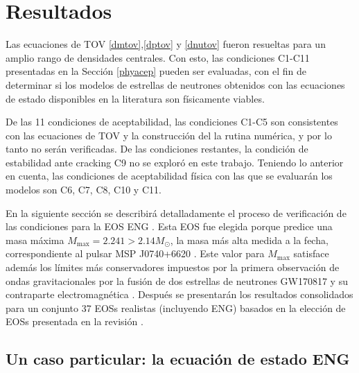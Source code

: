\chapter{Resultados}

\noindent Las ecuaciones de TOV \eqref{dmtov},\eqref{dptov} y \eqref{dnutov} fueron resueltas para un amplio rango de densidades centrales. Con esto, las condiciones C1-C11 presentadas en la Sección \ref{phyacep} pueden ser evaluadas, con el fin de determinar si los modelos de estrellas de neutrones obtenidos con las ecuaciones de estado disponibles en la literatura son físicamente viables.

De las 11 condiciones de aceptabilidad, las condiciones C1-C5 son consistentes con las ecuaciones de TOV y la construcción del la rutina numérica, y por lo tanto no serán verificadas. De las condiciones restantes, la condición de estabilidad ante cracking C9 no se exploró en este trabajo. Teniendo lo anterior en cuenta, las condiciones de aceptabilidad física con las que se evaluarán los modelos son C6, C7, C8, C10 y C11.


En la siguiente sección se describirá detalladamente el proceso de verificación de las condiciones para la EOS ENG \cite{Engvik1994}. Esta EOS fue elegida porque predice una masa máxima $M_{\text{max}}= 2.241 > 2.14M_{\odot}$, la masa más alta medida a la fecha, correspondiente al pulsar MSP J0740+6620 \cite{Cromartie2019}. Este valor para $M_{\text{max}}$ satisface además los límites más conservadores impuestos por la primera observación de ondas gravitacionales por la fusión de dos estrellas de neutrones GW170817 y su contraparte electromagnética \cite{Rezzolla2017,Radice2018,Ruiz2018,Shibata2019}. Después se presentarán los resultados consolidados para un conjunto 37 EOSs realistas (incluyendo ENG) basados en la elección de EOSs presentada en la revisión \cite{Ozel2016}.

\section{Un caso particular: la ecuación de estado ENG}

